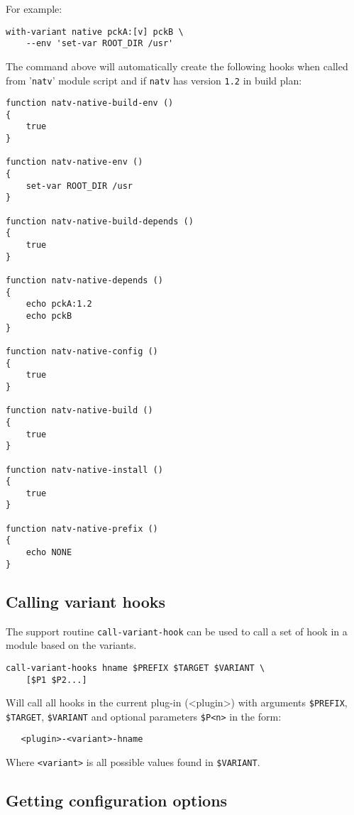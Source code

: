 \documentclass[a4paper,12pt,twoside]{article}
\newcommand{\code}[1]{\texttt{#1}}
\newcommand{\file}[1]{'{\texttt{#1}}'}
\begin{document}
For example:

\begin{lstlisting}
with-variant native pckA:[v] pckB \
	--env 'set-var ROOT_DIR /usr'
\end{lstlisting}

The command above will automatically create the following hooks when called from \file{natv} module script and if \code{natv} has version \code{1.2} in build plan:

\begin{lstlisting}
function natv-native-build-env ()
{
	true
}

function natv-native-env ()
{
	set-var ROOT_DIR /usr
}

function natv-native-build-depends ()
{
	true
}

function natv-native-depends ()
{
	echo pckA:1.2
	echo pckB
}

function natv-native-config ()
{
	true
}

function natv-native-build ()
{
	true
}

function natv-native-install ()
{
	true
}

function natv-native-prefix ()
{
	echo NONE
}
\end{lstlisting}

\subsection{Calling variant hooks}
\label{call variant hooks}

The support routine \code{call-variant-hook} can be used to call a set of hook in a module based on the variants.

\begin{lstlisting}
call-variant-hooks hname $PREFIX $TARGET $VARIANT \
    [$P1 $P2...]
\end{lstlisting}

Will call all hooks in the current plug-in (<plugin>) with arguments \code{\$PREFIX}, \code{\$TARGET}, \code{\$VARIANT} and optional parameters \code{\$P<n>} in the form:

\begin{lstlisting}
   <plugin>-<variant>-hname
\end{lstlisting}

Where \code{<variant>} is all possible values found in \code{\$VARIANT}.

\subsection{Getting configuration options}
\label{get config options}
\index{get-config-options}
\end{document}
